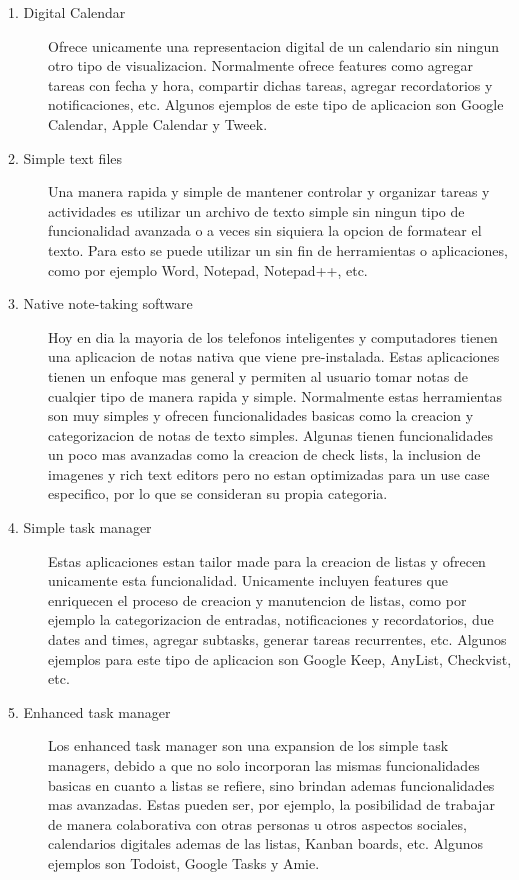 \begin{description}
    \item [1. Digital Calendar] Ofrece unicamente una representacion digital de un calendario sin ningun otro tipo de visualizacion. Normalmente ofrece features como agregar tareas con fecha y hora, compartir dichas tareas, agregar recordatorios y notificaciones, etc. Algunos ejemplos de este tipo de aplicacion son Google Calendar, Apple Calendar y Tweek.
    \item [2. Simple text files] Una manera rapida y simple de mantener controlar y organizar tareas y actividades es utilizar un archivo de texto simple sin ningun tipo de funcionalidad avanzada o a veces sin siquiera la opcion de formatear el texto. Para esto se puede utilizar un sin fin de herramientas o aplicaciones, como por ejemplo Word, Notepad, Notepad++, etc. 
    \item [3. Native note-taking software] Hoy en dia la mayoria de los telefonos inteligentes y computadores tienen una aplicacion de notas nativa que viene pre-instalada. Estas aplicaciones tienen un enfoque mas general y permiten al usuario tomar notas de cualqier tipo de manera rapida y simple. Normalmente estas herramientas son muy simples y ofrecen funcionalidades basicas como la creacion y categorizacion de notas de texto simples. Algunas tienen funcionalidades un poco mas avanzadas como la creacion de check lists, la inclusion de imagenes y rich text editors pero no estan optimizadas para un use case especifico, por lo que se consideran su propia categoria.
    \item [4. Simple task manager] Estas aplicaciones estan tailor made para la creacion de listas y ofrecen unicamente esta funcionalidad. Unicamente incluyen features que enriquecen el proceso de creacion y manutencion de listas, como por ejemplo la categorizacion de entradas, notificaciones y recordatorios, due dates and times, agregar subtasks, generar tareas recurrentes, etc. Algunos ejemplos para este tipo de aplicacion son Google Keep, AnyList, Checkvist, etc.
    \item [5. Enhanced task manager] Los enhanced task manager son una expansion de los simple task managers, debido a que no solo incorporan las mismas funcionalidades basicas en cuanto a listas se refiere, sino brindan ademas funcionalidades mas avanzadas. Estas pueden ser, por ejemplo, la posibilidad de trabajar de manera colaborativa con otras personas u otros aspectos sociales, calendarios digitales ademas de las listas, Kanban boards, etc. Algunos ejemplos son Todoist, Google Tasks y Amie.

\end{description}
